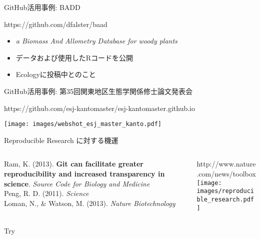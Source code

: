 \documentclass[ignorenonframetext,]{beamer}
\providecommand\faGit{{\FA\symbol{"F1D3}}}
\begin{document}
\begin{frame}{\faGithub GitHub活用事例: \newline BADD}

\footnotesize{https://github.com/dfalster/baad}

\begin{itemize}
\itemsep1pt\parskip0pt
\item
  \scriptsize{\textit{a Biomass And Allometry Database for woody plants}}
\item
  \scriptsize{データおよび使用したRコードを公開}
\item
  \scriptsize{Ecologyに投稿中とのこと}
\end{itemize}

\end{frame}

\begin{frame}{\faGithub GitHub活用事例:
\newline \normalsize{第35回関東地区生態学関係修士論文発表会}}

\tiny{https://github.com/esj-kantomaster/esj-kantomaster.github.io}

\texttt{[image: images/webshot\_esj\_master\_kanto.pdf]}

\end{frame}

\begin{frame}{\large{Reproducible Research \newline に対する機運}}

\begin{columns}[T]
  \begin{column}[T]{4cm}
    \tiny{\faFile Ram, K. (2013). \textcolor{Orange1}{\textbf{Git can facilitate greater reproducibility and increased transparency in science}}. \textit{Source Code for Biology and Medicine}}\\
    \tiny{\faFile Peng, R. D. (2011). \textit{Science}}\\
    \tiny{\faFile Loman, N., \& Watson, M. (2013). \textit{Nature Biotechnology}}
  \end{column}
  \begin{column}[T]{6cm}
    \tiny{http://www.nature.com/news/toolbox}\\
    \texttt{[image: images/reproducible\_research.pdf]}\\
  \end{column}
\end{columns}

\end{frame}

\begin{frame}{\faBullhorn Try \textcolor{Orange1}{\faGit}}

\center{
  \huge{\textbf{\textcolor{Orange1}{\faUser 自分のため、\\\faGroup 仲間のため、\\\faGlobe 誰かのため}}}
}

\end{frame}
\end{document}
